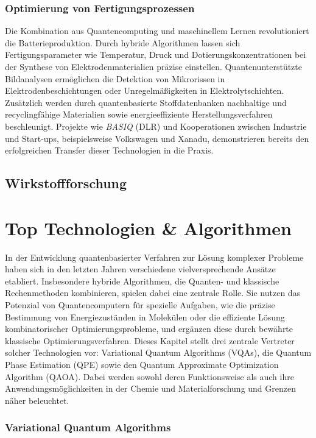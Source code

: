 \subsubsection*{Optimierung von Fertigungsprozessen}

Die Kombination aus Quantencomputing und maschinellem Lernen revolutioniert die Batterieproduktion. Durch hybride Algorithmen lassen sich Fertigungsparameter wie Temperatur, Druck und Dotierungskonzentrationen bei der Synthese von Elektrodenmaterialien präzise einstellen. Quantenunterstützte Bildanalysen ermöglichen die Detektion von Mikrorissen in Elektrodenbeschichtungen oder Unregelmäßigkeiten in Elektrolytschichten. Zusätzlich werden durch quantenbasierte Stoffdatenbanken nachhaltige und recyclingfähige Materialien sowie energieeffiziente Herstellungsverfahren beschleunigt. Projekte wie \textit{BASIQ} (DLR) und Kooperationen zwischen Industrie und Start-ups, beispielsweise Volkswagen und Xanadu, demonstrieren bereits den erfolgreichen Transfer dieser Technologien in die Praxis.

\subsection{Wirkstoffforschung}

\section{Top Technologien \& Algorithmen}
In der Entwicklung quantenbasierter Verfahren zur Lösung komplexer Probleme haben sich in den letzten Jahren verschiedene vielversprechende Ansätze etabliert. Insbesondere hybride Algorithmen, die Quanten- und klassische Rechenmethoden kombinieren, spielen dabei eine zentrale Rolle. Sie nutzen das Potenzial von Quantencomputern für spezielle Aufgaben, wie die präzise Bestimmung von Energiezuständen in Molekülen oder die effiziente Lösung kombinatorischer Optimierungsprobleme, und ergänzen diese durch bewährte klassische Optimierungsverfahren.
\vspace{1em}
Dieses Kapitel stellt drei zentrale Vertreter solcher Technologien vor: Variational Quantum Algorithms (VQAs), die Quantum Phase Estimation (QPE) sowie den Quantum Approximate Optimization Algorithm (QAOA). Dabei werden sowohl deren Funktionsweise als auch ihre Anwendungsmöglichkeiten in der Chemie und Materialforschung und Grenzen näher beleuchtet.



\subsubsection*{Variational Quantum Algorithms}

